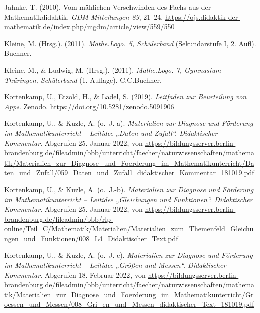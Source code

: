 \documentclass[
  ngerman,
]{scrbook}
\newlength{\cslhangindent}
\newlength{\cslentryspacingunit} %
\newenvironment{CSLReferences}[2] %
 {%
  \setlength{\parindent}{0pt}
  \ifodd #1
  \let\oldpar\par
  \def\par{\hangindent=\cslhangindent\oldpar}
  \fi
  \setlength{\parskip}{#2\cslentryspacingunit}
 }%
 {}
\theoremstyle{definition}
\theoremstyle{definition}
\theoremstyle{definition}
\theoremstyle{definition}
\theoremstyle{remark}
\begin{document}
\begin{CSLReferences}{1}{0}
\leavevmode{}%
Jahnke, T. (2010). Vom mählichen {Verschwinden} des {Fachs} aus der {Mathematikdidaktik}. \emph{GDM-Mitteilungen 89}, 21--24. \url{https://ojs.didaktik-der-mathematik.de/index.php/mgdm/article/view/559/550}

\leavevmode{}%
Kleine, M. (Hrsg.). (2011). \emph{Mathe.{Logo}. 5, {Schülerband}} (Sekundarstufe I, 2. Aufl). Buchner.

\leavevmode{}%
Kleine, M., \& Ludwig, M. (Hrsg.). (2011). \emph{Mathe.{Logo}. 7, {Gymnasium} {Thüringen}, {Schülerband}} (1. Auflage). C.C.Buchner.

\leavevmode{}%
Kortenkamp, U., Etzold, H., \& Ladel, S. (2019). \emph{Leitfaden zur {Beurteilung} von {Apps}}. Zenodo. \url{https://doi.org/10.5281/zenodo.5091906}

\leavevmode{}%
Kortenkamp, U., \& Kuzle, A. (o.~J.-a). \emph{Materialien zur {Diagnose} und {Förderung} im {Mathematikunterricht} -- {Leitidee} „{Daten} und {Zufall}``. {Didaktischer} {Kommentar}}. Abgerufen 25. Januar 2022, von \url{https://bildungsserver.berlin-brandenburg.de/fileadmin/bbb/unterricht/faecher/naturwissenschaften/mathematik/Materialien_zur_Diagnose_und_Foerderung_im_Mathematikunterricht/Daten_und_Zufall/059_Daten_und_Zufall_didaktischer_Kommentar_181019.pdf}

\leavevmode{}%
Kortenkamp, U., \& Kuzle, A. (o.~J.-b). \emph{Materialien zur {Diagnose} und {Förderung} im {Mathematikunterricht} -- {Leitidee} „{Gleichungen} und {Funktionen}``. {Didaktischer} {Kommentar}}. Abgerufen 25. Januar 2022, von \url{https://bildungsserver.berlin-brandenburg.de/fileadmin/bbb/rlp-online/Teil_C/Mathematik/Materialien/Materialien_zum_Themenfeld_Gleichungen_und_Funktionen/008_L4_Didaktischer_Text.pdf}

\leavevmode{}%
Kortenkamp, U., \& Kuzle, A. (o.~J.-c). \emph{Materialien zur {Diagnose} und {Förderung} im {Mathematikunterricht} -- {Leitidee} „{Größen} und {Messen}``. {Didaktischer} {Kommentar}}. Abgerufen 18. Februar 2022, von \url{https://bildungsserver.berlin-brandenburg.de/fileadmin/bbb/unterricht/faecher/naturwissenschaften/mathematik/Materialien_zur_Diagnose_und_Foerderung_im_Mathematikunterricht/Groessen_und_Messen/008_Gri_en_und_Messen_didaktischer_Text_181019.pdf}


\end{CSLReferences}
\end{document}

